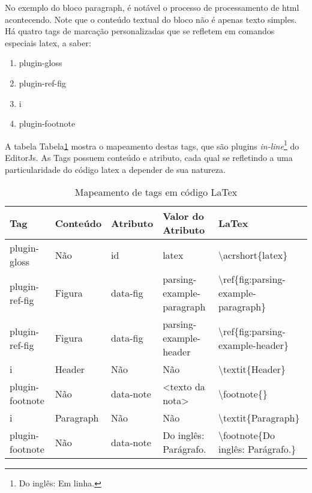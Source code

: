 No exemplo do bloco paragraph, é notável o processo de
processamento de
\acrshort{html}
acontecendo. Note que o conteúdo textual do bloco
não é apenas texto simples. Há quatro tags de
marcação personalizadas que se refletem em comandos
especiais
\acrshort{latex}, a saber:

\begin{enumerate}
        
	\item plugin-gloss
	\item plugin-ref-fig
	\item i
	\item plugin-footnote
    
\end{enumerate}

A tabela
Tabela\ref{tbl:plugins-latex-mapping}
mostra o mapeamento destas tags, que são plugins
\textit{in-line}\footnote{Do inglês: Em linha.
}
do EditorJs. As Tags possuem conteúdo e atributo, cada qual se
refletindo a uma particularidade do código
\acrshort{latex}
a depender de sua natureza.

\begin{table}[H]
    \centering
    \caption{Mapeamento de tags em código LaTex}
    \label{tbl:plugins-latex-mapping}
    \renewcommand{\arraystretch}{1.5}
    \begin{tabular}{p{1.9200cm} p{1.9200cm} p{1.9200cm} p{3.2000cm} p{7.0400cm}}
        \hline
        \textbf{Tag} & \textbf{Conteúdo} & \textbf{Atributo} & \textbf{Valor do Atributo} & \textbf{LaTex} \\
        \hline
        plugin-gloss & Não & id & latex & \textbackslash acrshort\{latex\} \\
		plugin-ref-fig & Figura & data-fig & parsing-example-paragraph & \textbackslash ref\{fig:parsing-example-paragraph\} \\
		plugin-ref-fig & Figura & data-fig & parsing-example-header & \textbackslash ref\{fig:parsing-example-header\} \\
		i & Header & Não & Não & \textbackslash textit\{Header\} \\
		plugin-footnote & Não & data-note & <texto da nota> & \textbackslash footnote\{<texto da nota>\} \\
		i & Paragraph & Não & Não & \textbackslash textit\{Paragraph\} \\
		plugin-footnote & Não & data-note & Do inglês: Parágrafo. & \textbackslash footnote\{Do inglês: Parágrafo.\} \\
        \hline
        
    \end{tabular}
\end{table}

